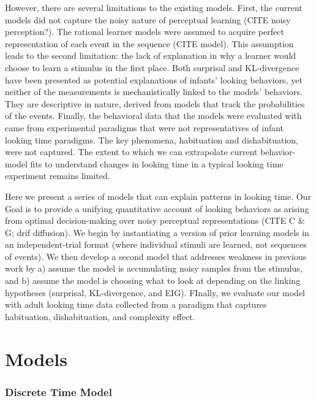 \documentclass[10pt, letterpaper]{article}
\begin{document}
However, there are several limitations to the existing models. First,
the current models did not capture the noisy nature of perceptual
learning (CITE noisy perception?). The rational learner models were
assumed to acquire perfect representation of each event in the sequence
(CITE model). This assumption leads to the second limitation: the lack
of explanation in why a learner would choose to learn a stimulus in the
first place. Both surprisal and KL-divergence have been presented as
potential explanations of infants' looking behaviors, yet neither of the
measurements is mechanistically linked to the models' behaviors. They
are descriptive in nature, derived from models that track the
probabilities of the events. Finally, the behavioral data that the
models were evaluated with came from experimental paradigms that were
not representatives of infant looking time paradigms. The key phenomena,
habituation and dishabituation, were not captured. The extent to which
we can extrapolate current behavior-model fits to understand changes in
looking time in a typical looking time experiment remains limited.

Here we present a series of models that can explain patterns in looking
time. Our Goal is to provide a unifying quantitative account of looking
behaviors as arising from optimal decision-making over noisy perceptual
representations (CITE C \& G; drif diffusion). We begin by instantiating
a version of prior learning models in an independent-trial format (where
individual stimuli are learned, not sequences of events). We then
develop a second model that addresses weakness in previous work by a)
assume the model is accumulating noisy samples from the stimulus, and b)
assume the model is choosing what to look at depending on the linking
hypotheses (surprisal, KL-divergence, and EIG). FInally, we evaluate our
model with adult looking time data collected from a paradigm that
captures habituation, dishabituation, and complexity effect.

\hypertarget{models}{%
\section{Models}\label{models}}

\hypertarget{discrete-time-model}{%
\subsubsection{Discrete Time Model}\label{discrete-time-model}}
\end{document}
